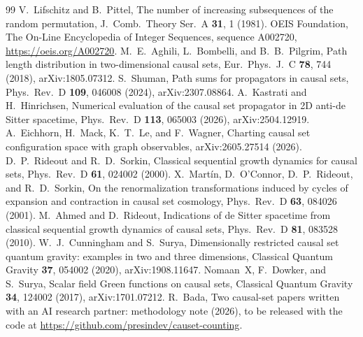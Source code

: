 \documentclass[prd,twocolumn,superscriptaddress,nofootinbib,amsmath,amssymb,floatfix]{revtex4-2}
\begin{document}
\begin{thebibliography}{99}
 V.~Lifschitz and B.~Pittel, The number of increasing subsequences of the random permutation, J.\ Comb.\ Theory Ser.\ A \textbf{31}, 1 (1981).
 OEIS Foundation, The On-Line Encyclopedia of Integer Sequences, sequence A002720, \url{https://oeis.org/A002720}.
 M.~E.~Aghili, L.~Bombelli, and B.~B.~Pilgrim, Path length distribution in two-dimensional causal sets, Eur.\ Phys.\ J.\ C \textbf{78}, 744 (2018), arXiv:1805.07312.
 S.~Shuman, Path sums for propagators in causal sets, Phys.\ Rev.\ D \textbf{109}, 046008 (2024), arXiv:2307.08864.
 A.~Kastrati and H.~Hinrichsen, Numerical evaluation of the causal set propagator in 2D anti-de Sitter spacetime, Phys.\ Rev.\ D \textbf{113}, 065003 (2026), arXiv:2504.12919.
 A.~Eichhorn, H.~Mack, K.~T.~Le, and F.~Wagner, Charting causal set configuration space with graph observables, arXiv:2605.27514 (2026).
 D.~P.~Rideout and R.~D.~Sorkin, Classical sequential growth dynamics for causal sets, Phys.\ Rev.\ D \textbf{61}, 024002 (2000).
 X.~Mart\'in, D.~O'Connor, D.~P.~Rideout, and R.~D.~Sorkin, On the renormalization transformations induced by cycles of expansion and contraction in causal set cosmology, Phys.\ Rev.\ D \textbf{63}, 084026 (2001).
 M.~Ahmed and D.~Rideout, Indications of de Sitter spacetime from classical sequential growth dynamics of causal sets, Phys.\ Rev.\ D \textbf{81}, 083528 (2010).
 W.~J.~Cunningham and S.~Surya, Dimensionally restricted causal set quantum gravity: examples in two and three dimensions, Classical Quantum Gravity \textbf{37}, 054002 (2020), arXiv:1908.11647.
 Nomaan~X, F.~Dowker, and S.~Surya, Scalar field Green functions on causal sets, Classical Quantum Gravity \textbf{34}, 124002 (2017), arXiv:1701.07212.
 R.~Bada, Two causal-set papers written with an AI research partner: methodology note (2026), to be released with the code at \url{https://github.com/presindev/causet-counting}.
\end{thebibliography}
\end{document}
